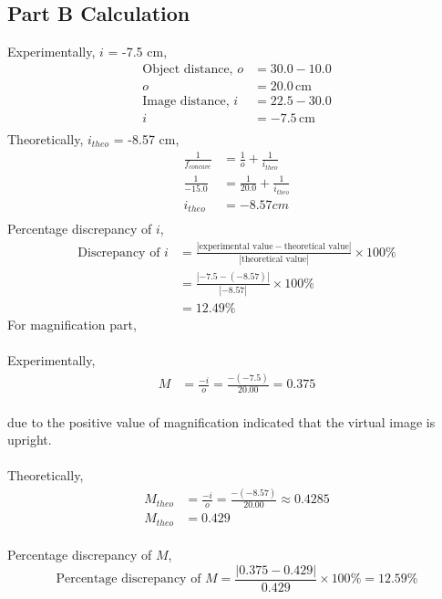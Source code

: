\documentclass[a4paper,11pt]{article}
\begin{document}
\subsection*{Part B Calculation}
Experimentally, $i$ = -7.5 cm, \\
\begin{align*}
\text{Object distance, } o &= 30.0 - 10.0 \\
o &= 20.0 \, \text{cm} \\
\text{Image distance, } i &= 22.5 - 30.0 \\
i &= -7.5 \, \text{cm} \\
\end{align*}
Theoretically, $i_{theo}$ = -8.57 cm, \\
\begin{align*}
\frac{1}{f_{concave}} &= \frac{1}{o} + \frac{1}{i_{theo}}\\
\frac{1}{-15.0} &= \frac{1}{20.0} + \frac{1}{i_{theo}}\\
i_{theo} &= -8.57 cm\\
\end{align*}
Percentage discrepancy of $i$,
\begin{align*}
\text{Discrepancy of } i &= \frac{|\text{experimental value} - \text{theoretical value}|}{|\text{theoretical value}|} \times 100\%\\
&= \frac{|-7.5 -(-8.57)|}{|-8.57|} \times 100\%\\
&= 12.49 \%
\end{align*}
For magnification part,\\
\\
Experimentally,
\begin{align*}
M &= \frac{-i}{o} = \frac{-(-7.5)}{20.00} = 0.375
\end{align*}\\
due to the positive value of magnification indicated that the virtual image is upright.\\
\\
Theoretically,
\begin{align*}
M_{theo} &= \frac{-i}{o} = \frac{-(-8.57)}{20.00}  \approx 0.4285 \\
M_{theo} &= 0.429
\end{align*}\\
Percentage discrepancy of $M$,
\begin{equation*}
\text{Percentage discrepancy of } M = \frac{|0.375 - 0.429|}{0.429} \times 100\% = 12.59\%
\end{equation*}
\newpage
\end{document}
